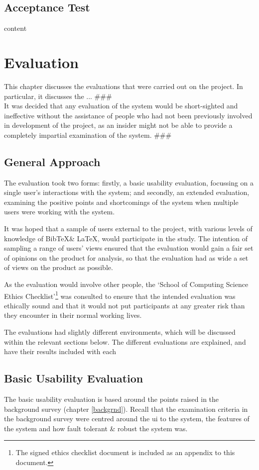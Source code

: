 \documentclass{l4proj}
\newcommand{\BibTeX}{B{\sc ib}\TeX}
\newcommand{\bibtex}{\BibTeX}
\newcommand{\revisit}{\#\#\#}
\begin{document}
\section{Acceptance Test}
content

\chapter{Evaluation}
\label{eval}
This chapter discusses the evaluations that were carried out on the project.  In particular, it discusses the ... \revisit \\

It was decided that any evaluation of the system would be short-sighted and ineffective without the assistance of people who had not been previously involved in development of the project, as an insider might not be able to provide a completely impartial examination of the system. \revisit

\section{General Approach}
The evaluation took two forms: firstly, a basic usability evaluation, focussing on a single user's interactions with the system; and secondly, an extended evaluation, examining the positive points and shortcomings of the system when multiple users were working with the system.

It was hoped that a sample of users external to the project, with various levels of knowledge of \bibtex \& \LaTeX, would participate in the study. The intention of sampling a range of users' views ensured that the evaluation would gain a fair set of opinions on the product for analysis, so that the evaluation had as wide a set of views on the product as possible. 

As the evaluation would involve other people, the `School of Computing Science Ethics Checklist'\footnote{The signed ethics checklist document is included as an appendix to this document.} was consulted to ensure that the intended evaluation was ethically sound and that it would not put participants at any greater risk than they encounter in their normal working lives.

The evaluations had slightly different environments, which will be discussed within the relevant sections below.  The different evaluations are explained, and have their results included with each 

\section{Basic Usability Evaluation}
The basic usability evaluation is based around the points raised in the background survey (chapter \ref{backgrnd}).  Recall that the examination criteria in the background survey were centred around the \gls{ui} to the system, the features of the system and how fault tolerant \& robust the system was.
\end{document}
